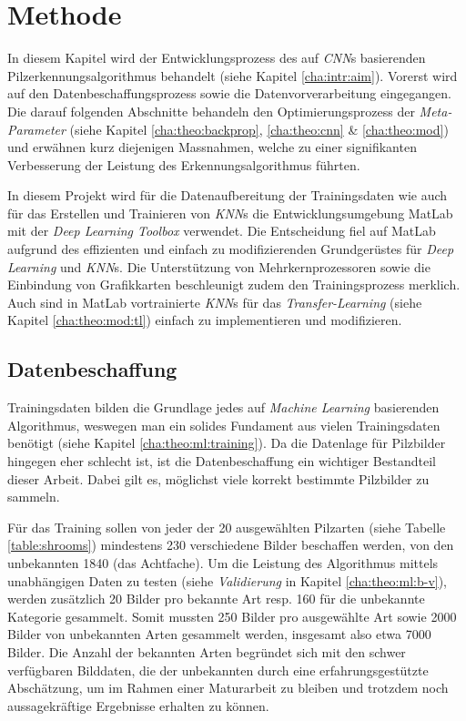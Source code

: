 \section{Methode}\label{cha:method}

In diesem Kapitel wird der Entwicklungsprozess des auf \textit{CNN}s basierenden Pilzerkennungsalgorithmus behandelt (siehe Kapitel \ref{cha:intr:aim}). Vorerst wird auf den Datenbeschaffungsprozess sowie die Datenvorverarbeitung eingegangen. Die darauf folgenden Abschnitte behandeln den Optimierungsprozess der \textit{Meta-Parameter} (siehe Kapitel \ref{cha:theo:backprop}, \ref{cha:theo:cnn} \& \ref{cha:theo:mod}) und erwähnen kurz diejenigen Massnahmen, welche zu einer signifikanten Verbesserung der Leistung des Erkennungsalgorithmus führten.

In diesem Projekt wird für die Datenaufbereitung der Trainingsdaten wie auch für das Erstellen und Trainieren von \textit{KNN}s die Entwicklungsumgebung MatLab mit der \textit{Deep Learning Toolbox}\cite{matlab} verwendet. Die Entscheidung fiel auf MatLab aufgrund des effizienten und einfach zu modifizierenden Grundgerüstes für \textit{Deep Learning} und \textit{KNN}s. Die Unterstützung von Mehrkernprozessoren sowie die Einbindung von Grafikkarten beschleunigt zudem den Trainingsprozess merklich. Auch sind in MatLab vortrainierte \textit{KNN}s für das \textit{Transfer-Learning} (siehe Kapitel \ref{cha:theo:mod:tl}) einfach zu implementieren und modifizieren.

\subsection{Datenbeschaffung} \label{cha:met:datagathering}
Trainingsdaten bilden die Grundlage jedes auf \textit{Machine Learning} basierenden Algorithmus, weswegen man ein solides Fundament aus vielen Trainingsdaten benötigt (siehe Kapitel \ref{cha:theo:ml:training}). Da die Datenlage für Pilzbilder hingegen eher schlecht ist, ist die Datenbeschaffung ein wichtiger Bestandteil dieser Arbeit. Dabei gilt es, möglichst viele korrekt bestimmte Pilzbilder zu sammeln.

Für das Training sollen von jeder der 20 ausgewählten Pilzarten (siehe Tabelle \ref{table:shrooms}) mindestens 230 verschiedene Bilder beschaffen werden, von den unbekannten 1840 (das Achtfache). Um die Leistung des Algorithmus mittels unabhängigen Daten zu testen (siehe \textit{Validierung} in Kapitel \ref{cha:theo:ml:b-v}), werden zusätzlich 20 Bilder pro bekannte Art resp. 160 für die unbekannte Kategorie gesammelt. Somit mussten 250 Bilder pro ausgewählte Art sowie 2000 Bilder von unbekannten Arten gesammelt werden, insgesamt also etwa 7000 Bilder. Die Anzahl der bekannten Arten begründet sich mit den schwer verfügbaren Bilddaten, die der unbekannten durch eine erfahrungsgestützte Abschätzung, um im Rahmen einer Maturarbeit zu bleiben und trotzdem noch aussagekräftige Ergebnisse erhalten zu können.

